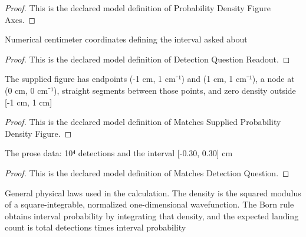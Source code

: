 \begin{proof}
  This is the declared model definition of Probability Density Figure Axes.
\end{proof}
\begin{definition}
  \label{def:physics:phyx-mini-0505:phyxminiproblems-problemphyxmini0505-detectionquestionreadout}
  Numerical centimeter coordinates defining the interval asked about
\end{definition}
\begin{proof}
  This is the declared model definition of Detection Question Readout.
\end{proof}
\begin{definition}
  \label{def:physics:phyx-mini-0505:phyxminiproblems-problemphyxmini0505-matchessuppliedprobabilitydensityfigure}
  The supplied figure has endpoints (-1 cm, 1 cm⁻¹) and (1 cm, 1 cm⁻¹), a node at (0 cm, 0 cm⁻¹), straight segments between those points, and zero density outside [-1 cm, 1 cm]
\end{definition}
\begin{proof}
  This is the declared model definition of Matches Supplied Probability Density Figure.
\end{proof}
\begin{definition}
  \label{def:physics:phyx-mini-0505:phyxminiproblems-problemphyxmini0505-matchesdetectionquestion}
  The prose data: 10⁴ detections and the interval [-0.30, 0.30] cm
\end{definition}
\begin{proof}
  This is the declared model definition of Matches Detection Question.
\end{proof}
\begin{definition}
  \label{def:physics:phyx-mini-0505:phyxminiproblems-problemphyxmini0505-satisfiesbornandcountinglaws}
  General physical laws used in the calculation. The density is the squared modulus of a square-integrable, normalized one-dimensional wavefunction. The Born rule obtains interval probability by integrating that density, and the expected landing count is total detections times interval probability
\end{definition}

